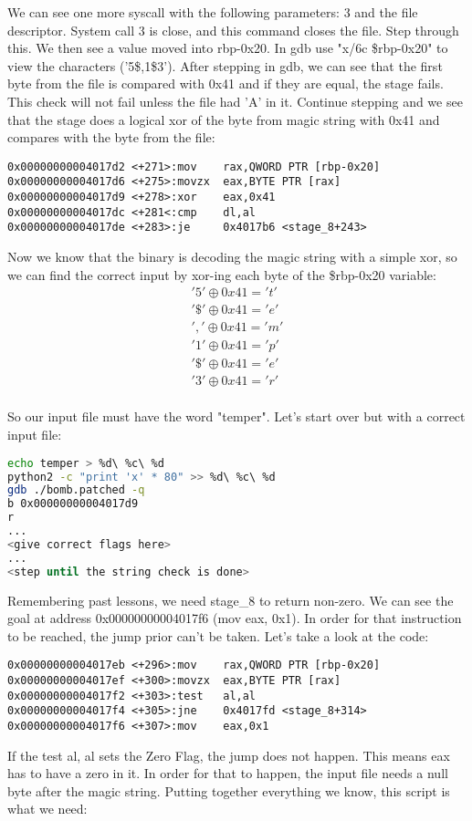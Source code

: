 \documentclass{article}
\begin{document}
\par
We can see one more syscall with the following parameters: 3 and the file 
descriptor.  System call 3 is close, and this command closes the file.  Step
through this.  We then see a value moved into rbp-0x20.  In gdb use 
"x/6c \$rbp-0x20" to view the characters ('5\$,1\$3').  After stepping in gdb,
we can see that the first byte from the file is compared with 0x41 and if they
are equal, the stage fails.  This check will not fail unless the file had 'A'
in it.  Continue stepping and we see that the stage does a logical xor of the
byte from magic string with 0x41 and compares with the byte from the file:
\begin{lstlisting}
0x00000000004017d2 <+271>:mov    rax,QWORD PTR [rbp-0x20]
0x00000000004017d6 <+275>:movzx  eax,BYTE PTR [rax]
0x00000000004017d9 <+278>:xor    eax,0x41
0x00000000004017dc <+281<:cmp    dl,al
0x00000000004017de <+283>:je     0x4017b6 <stage_8+243>
\end{lstlisting}
\par
Now we know that the binary is decoding the magic string with a simple xor,
so we can find the correct input by xor-ing each byte of the \$rbp-0x20 
variable:
\begin{eqnarray*}
 '5' \oplus   0x41 = 't' \\ 
 '\$' \oplus  0x41 = 'e' \\ 
 ',' \oplus   0x41 = 'm' \\ 
 '1' \oplus   0x41 = 'p' \\ 
 '\$' \oplus  0x41 = 'e' \\ 
 '3' \oplus   0x41 = 'r' \\ 
\end{eqnarray*}
\par
So our input file must have the word "temper".  Let's start over but with a 
correct input file:

\begin{lstlisting}[language=Bash]
echo temper > %d\ %c\ %d
python2 -c "print 'x' * 80" >> %d\ %c\ %d
gdb ./bomb.patched -q
b 0x00000000004017d9
r
...
<give correct flags here>
...
<step until the string check is done>
\end{lstlisting}
\par
Remembering past lessons, we need stage\_8 to return non-zero.  We can see the 
goal at address 0x00000000004017f6 (mov eax, 0x1).  In order for that 
instruction to be reached, the jump prior can't be taken.  Let's take a look 
at the code:
\begin{lstlisting}
0x00000000004017eb <+296>:mov    rax,QWORD PTR [rbp-0x20]
0x00000000004017ef <+300>:movzx  eax,BYTE PTR [rax]
0x00000000004017f2 <+303>:test   al,al
0x00000000004017f4 <+305>:jne    0x4017fd <stage_8+314>
0x00000000004017f6 <+307>:mov    eax,0x1
\end{lstlisting}
\par
If the test al, al sets the Zero Flag, the jump does not happen.  This means
eax has to have a zero in it.  In order for that to happen, the input file 
needs a null byte after the magic string.  Putting together everything we 
know, this script is what we need:
\end{document}

